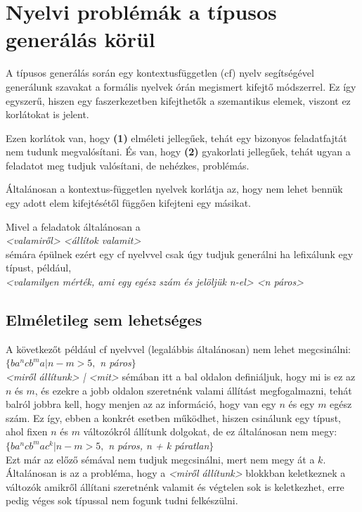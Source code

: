 \documentclass[12pt]{report}
\theoremstyle{definition}
\begin{document}
\section{Nyelvi problémák a típusos generálás körül}
A típusos generálás során egy kontextusfüggetlen (cf) nyelv segítségével generálunk szavakat a formális nyelvek órán megismert kifejtő módszerrel. Ez így egyszerű, hiszen egy faszerkezetben kifejthetők a szemantikus elemek, viszont ez korlátokat is jelent.

Ezen korlátok van, hogy \textbf{(1)} elméleti jellegűek, tehát egy bizonyos feladatfajtát nem tudunk megvalósítani. És van, hogy \textbf{(2)} gyakorlati jellegűek, tehát ugyan a feladatot meg tudjuk valósítani, de nehézkes, problémás.

Általánosan a kontextus-független nyelvek korlátja az, hogy nem lehet bennük egy adott elem kifejtésétől függően kifejteni egy másikat.

Mivel a feladatok általánosan a\\
\textit{<valamiről> <állítok valamit>}\\
sémára épülnek ezért egy cf nyelvvel csak úgy tudjuk generálni ha lefixálunk egy típust, például,\\
\textit{<valamilyen mérték, ami egy egész szám és jelöljük n-el>  <n páros>}
\subsection*{Elméletileg sem lehetséges}
A következőt például cf nyelvvel (legalábbis általánosan) nem lehet megcsinálni:\\
$\{ba^ncb^ma | n - m >  5,$ \textit{n páros}$\}$\\
\textit{<miről állítunk> | <mit>} sémában itt a bal oldalon definiáljuk, hogy mi is ez az $n$ és $m$, és ezekre a jobb oldalon szeretnénk valami állítást megfogalmazni, tehát balról jobbra kell, hogy menjen az az információ, hogy van egy $n$ és egy $m$ egész szám. Ez így, ebben a konkrét esetben működhet, hiszen csinálunk egy típust, ahol fixen $n$ és $m$ változókról állítunk dolgokat, de ez általánosan nem megy:\\
$\{ba^ncb^mac^k | n-m > 5,$ \textit{n páros, n + k páratlan}$\}$\\
Ezt már az előző sémával nem tudjuk megcsinálni, mert nem megy át a $k$. Általánosan is az a probléma, hogy a \textit{<miről állítunk>} blokkban keletkeznek a változók amikről állítani szeretnénk valamit és végtelen sok is keletkezhet, erre pedig véges sok típussal nem fogunk tudni felkészülni.
\end{document}
